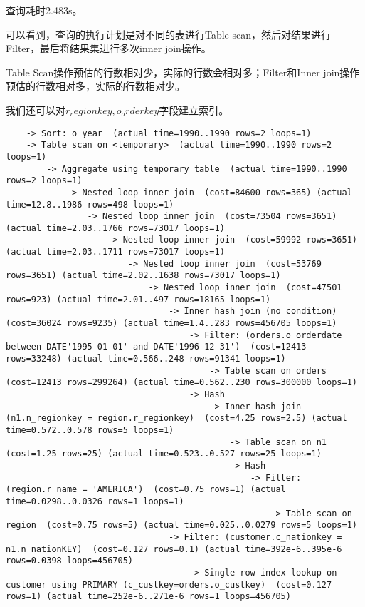 \documentclass{article}
\begin{document}
查询耗时2.483s。

可以看到，查询的执行计划是对不同的表进行Table scan，然后对结果进行Filter，最后将结果集进行多次inner join操作。

Table Scan操作预估的行数相对少，实际的行数会相对多；Filter和Inner join操作预估的行数相对多，实际的行数相对少。

我们还可以对$r_regionkey,o_orderkey$字段建立索引。

\begin{lstlisting}
    -> Sort: o_year  (actual time=1990..1990 rows=2 loops=1)
    -> Table scan on <temporary>  (actual time=1990..1990 rows=2 loops=1)
        -> Aggregate using temporary table  (actual time=1990..1990 rows=2 loops=1)
            -> Nested loop inner join  (cost=84600 rows=365) (actual time=12.8..1986 rows=498 loops=1)
                -> Nested loop inner join  (cost=73504 rows=3651) (actual time=2.03..1766 rows=73017 loops=1)
                    -> Nested loop inner join  (cost=59992 rows=3651) (actual time=2.03..1711 rows=73017 loops=1)
                        -> Nested loop inner join  (cost=53769 rows=3651) (actual time=2.02..1638 rows=73017 loops=1)
                            -> Nested loop inner join  (cost=47501 rows=923) (actual time=2.01..497 rows=18165 loops=1)
                                -> Inner hash join (no condition)  (cost=36024 rows=9235) (actual time=1.4..283 rows=456705 loops=1)
                                    -> Filter: (orders.o_orderdate between DATE'1995-01-01' and DATE'1996-12-31')  (cost=12413 rows=33248) (actual time=0.566..248 rows=91341 loops=1)
                                        -> Table scan on orders  (cost=12413 rows=299264) (actual time=0.562..230 rows=300000 loops=1)
                                    -> Hash
                                        -> Inner hash join (n1.n_regionkey = region.r_regionkey)  (cost=4.25 rows=2.5) (actual time=0.572..0.578 rows=5 loops=1)
                                            -> Table scan on n1  (cost=1.25 rows=25) (actual time=0.523..0.527 rows=25 loops=1)
                                            -> Hash
                                                -> Filter: (region.r_name = 'AMERICA')  (cost=0.75 rows=1) (actual time=0.0298..0.0326 rows=1 loops=1)
                                                    -> Table scan on region  (cost=0.75 rows=5) (actual time=0.025..0.0279 rows=5 loops=1)
                                -> Filter: (customer.c_nationkey = n1.n_nationKEY)  (cost=0.127 rows=0.1) (actual time=392e-6..395e-6 rows=0.0398 loops=456705)
                                    -> Single-row index lookup on customer using PRIMARY (c_custkey=orders.o_custkey)  (cost=0.127 rows=1) (actual time=252e-6..271e-6 rows=1 loops=456705)

\end{lstlisting}
\end{document}
